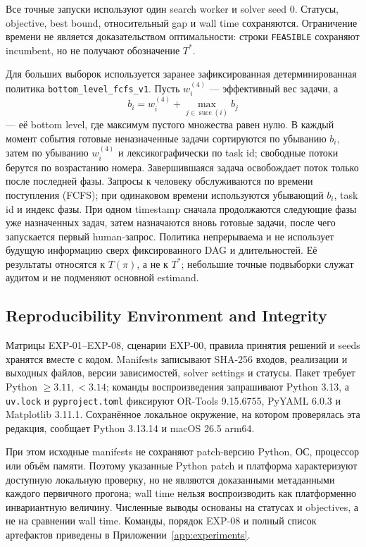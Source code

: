 Все точные запуски используют один search worker и solver seed 0. Статусы,
objective, best bound, относительный gap и wall time сохраняются. Ограничение
времени не является доказательством оптимальности: строки \texttt{FEASIBLE}
сохраняют incumbent, но не получают обозначение $T^*$.

Для больших выборок используется заранее зафиксированная детерминированная
политика \texttt{bottom\_level\_fcfs\_v1}. Пусть $w_i^{(4)}$ --- эффективный
вес задачи, а
\[
  b_i=w_i^{(4)}+\max_{j\in\operatorname{succ}(i)}b_j
\]
--- её bottom level, где максимум пустого множества равен нулю. В каждый момент
события готовые неназначенные задачи сортируются по убыванию $b_i$, затем по
убыванию $w_i^{(4)}$ и лексикографически по task id; свободные потоки берутся
по возрастанию номера. Завершившаяся задача освобождает поток только после
последней фазы. Запросы к человеку обслуживаются по времени поступления
(FCFS); при одинаковом времени используются убывающий $b_i$, task id и индекс
фазы. При одном timestamp сначала продолжаются следующие фазы уже назначенных
задач, затем назначаются вновь готовые задачи, после чего запускается первый
human-запрос. Политика непрерываема и не использует будущую информацию сверх
фиксированного DAG и длительностей. Её результаты относятся к $T(\pi)$, а не к
$T^*$; небольшие точные подвыборки служат аудитом и не подменяют основной
estimand.

\subsection{Reproducibility Environment and Integrity}

Матрицы EXP-01--EXP-08, сценарии EXP-00, правила принятия решений и seeds
хранятся вместе с кодом. Manifests записывают SHA-256 входов, реализации и
выходных файлов, версии зависимостей, solver settings и статусы. Пакет требует
Python $\ge3.11,<3.14$; команды воспроизведения запрашивают Python 3.13, а
\texttt{uv.lock} и \texttt{pyproject.toml} фиксируют OR-Tools 9.15.6755,
PyYAML 6.0.3 и Matplotlib 3.11.1. Сохранённое локальное окружение, на котором
проверялась эта редакция, сообщает Python 3.13.14 и macOS 26.5 arm64.

При этом исходные manifests не сохраняют patch-версию Python, ОС, процессор или
объём памяти. Поэтому указанные Python patch и платформа характеризуют
доступную локальную проверку, но не являются доказанными метаданными каждого
первичного прогона; wall time нельзя воспроизводить как платформенно
инвариантную величину. Численные выводы основаны на статусах и objectives, а не
на сравнении wall time. Команды, порядок EXP-08 и полный список артефактов
приведены в Приложении~\ref{app:experiments}.
